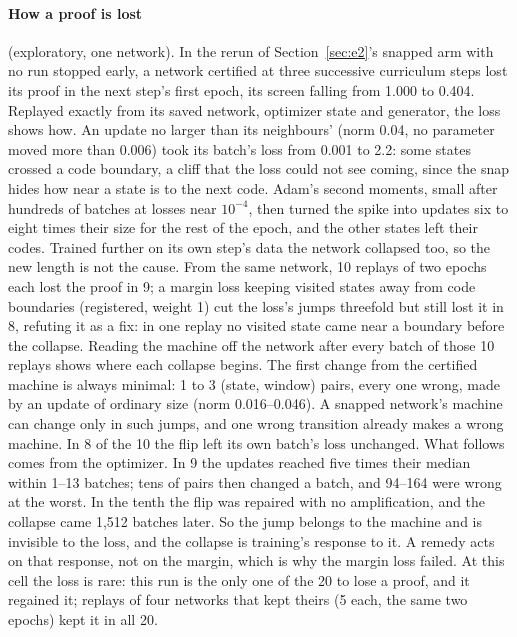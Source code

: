 \documentclass[11pt]{article}
\begin{document}
\paragraph{How a proof is lost} (exploratory, one network). In the rerun of
Section~\ref{sec:e2}'s snapped arm with no run stopped early, a network certified at three
successive curriculum steps lost its proof in the next
step's first epoch, its screen falling from 1.000 to 0.404. Replayed exactly from its saved
network, optimizer state and generator, the loss shows how. An update no larger than its
neighbours' (norm 0.04, no parameter moved more than 0.006) took its batch's loss from 0.001 to
2.2: some states crossed a code boundary, a cliff that the loss could not see coming, since the
snap hides how near a state is to the next code. Adam's \citep{kingma-2015-adam} second moments,
small after hundreds of batches at losses near $10^{-4}$, then turned the spike into updates six to
eight times their size for the rest of the epoch, and the other states left their codes. Trained
further on its own step's data the network collapsed too, so the new length is not the cause.
From the same network, 10 replays of two epochs each lost the proof in 9; a margin loss keeping
visited states away from code boundaries (registered, weight 1) cut the loss's jumps threefold but
still lost it in 8, refuting it as a fix: in one replay no visited state came near a boundary
before the collapse. Reading the machine off the network after every batch of those 10 replays
shows where each collapse begins. The first change from the certified machine is always minimal:
1 to 3 (state, window) pairs, every one wrong, made by an update of ordinary size (norm
0.016--0.046). A snapped network's machine can change only in such jumps, and one wrong transition
already makes a wrong machine. In 8 of the 10 the flip left its own batch's loss unchanged. What
follows comes from the optimizer. In 9 the updates reached five times their median within 1--13
batches; tens of pairs then changed a batch, and 94--164 were wrong at the worst. In the tenth the
flip was repaired with no amplification, and the collapse came 1{,}512 batches later. So the jump
belongs to the machine and is invisible to the loss, and the collapse is training's response to
it. A remedy acts on that response, not on the margin, which is why the margin loss failed. At
this cell the loss is rare: this run is the only one of the 20 to lose a proof, and it regained it;
replays of four networks that kept theirs (5 each, the same two epochs) kept it in all 20.
\end{document}
